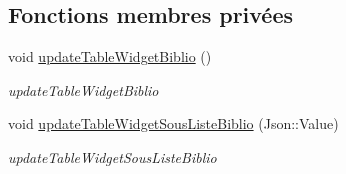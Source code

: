 \subsection*{Fonctions membres privées}
\begin{DoxyCompactItemize}
\item 
\mbox{\label{classAppMainWindow_ae832854ee1f170fa40bd7e4bcd0c8c06}} 
void \hyperlink{classAppMainWindow_ae832854ee1f170fa40bd7e4bcd0c8c06}{update\+Table\+Widget\+Biblio} ()
\begin{DoxyCompactList}\small\item\em update\+Table\+Widget\+Biblio \end{DoxyCompactList}\item 
\mbox{\label{classAppMainWindow_aec2b8b96cd63d0b2845f12687b4ff2e8}} 
void \hyperlink{classAppMainWindow_aec2b8b96cd63d0b2845f12687b4ff2e8}{update\+Table\+Widget\+Sous\+Liste\+Biblio} (Json\+::\+Value)
\begin{DoxyCompactList}\small\item\em update\+Table\+Widget\+Sous\+Liste\+Biblio \end{DoxyCompactList}\end{DoxyCompactItemize}
